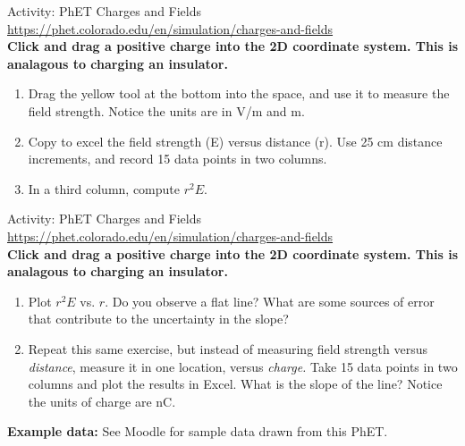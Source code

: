 \documentclass{beamer}
\begin{document}
\begin{frame}{Activity: PhET Charges and Fields}
\small
\url{https://phet.colorado.edu/en/simulation/charges-and-fields} \\ \vspace{0.2cm}
\textbf{Click and drag a positive charge into the 2D coordinate system.  This is analagous to charging an insulator.}
\begin{enumerate}
\item Drag the yellow tool at the bottom into the space, and use it to measure the field strength.  Notice the units are in V/m and m.
\item Copy to excel the field strength (E) versus distance (r).  Use 25 cm distance increments, and record 15 data points in two columns.
\item In a third column, compute $r^2 E$.
\end{enumerate}
\end{frame}

\begin{frame}{Activity: PhET Charges and Fields}
\small
\url{https://phet.colorado.edu/en/simulation/charges-and-fields} \\ \vspace{0.2cm}
\textbf{Click and drag a positive charge into the 2D coordinate system.  This is analagous to charging an insulator.}
\begin{enumerate}
\item Plot $r^2 E$ vs. $r$.  Do you observe a flat line?  What are some sources of error that contribute to the uncertainty in the slope?
\item Repeat this same exercise, but instead of measuring field strength versus \textit{distance}, measure it in one location, versus \textit{charge.} Take 15 data points in two columns and plot the results in Excel.  What is the slope of the line?  Notice the units of charge are nC.
\end{enumerate}
\textbf{Example data:} See Moodle for sample data drawn from this PhET.
\end{frame}
\end{document}
